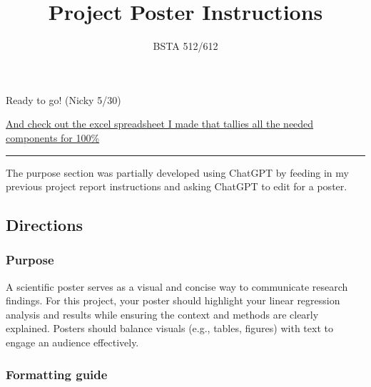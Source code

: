 \documentclass[
  letterpaper,
  DIV=11,
  numbers=noendperiod]{scrartcl}
\title{Project Poster Instructions}
\subtitle{BSTA 512/612}
\author{}
\date{}
\begin{document}
\maketitle


\begin{tcolorbox}[enhanced jigsaw, coltitle=black, bottomtitle=1mm, breakable, opacityback=0, toprule=.15mm, left=2mm, opacitybacktitle=0.6, rightrule=.15mm, colframe=quarto-callout-important-color-frame, toptitle=1mm, bottomrule=.15mm, arc=.35mm, titlerule=0mm, title=\textcolor{quarto-callout-important-color}{\faExclamation}\hspace{0.5em}{Important}, leftrule=.75mm, colbacktitle=quarto-callout-important-color!10!white, colback=white]

Ready to go! (Nicky 5/30)

\href{https://ohsuitg-my.sharepoint.com/:x:/r/personal/wakim_ohsu_edu/_layouts/15/Doc.aspx?sourcedoc=\%7B1C6F4620-298D-4D42-A15E-8B5522E6A995\%7D&file=Project_Rubric.xlsx&action=default&mobileredirect=true}{And
check out the excel spreadsheet I made that tallies all the needed
components for 100\%}

\end{tcolorbox}

\begin{center}\rule{0.5\linewidth}{0.5pt}\end{center}

The purpose section was partially developed using ChatGPT by feeding in
my previous project report instructions and asking ChatGPT to edit for a
poster.

\subsection{Directions}\label{directions}

\subsubsection{Purpose}\label{purpose}

A scientific poster serves as a visual and concise way to communicate
research findings. For this project, your poster should highlight your
linear regression analysis and results while ensuring the context and
methods are clearly explained. Posters should balance visuals (e.g.,
tables, figures) with text to engage an audience effectively.

\subsubsection{Formatting guide}\label{formatting-guide}
\end{document}
